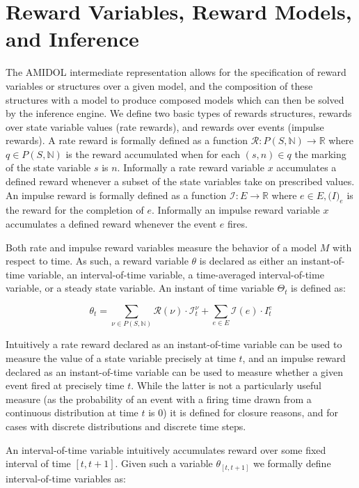\documentclass[11pt]{article}
\newcommand{\amidol}{\textsc{AMIDOL}}
\begin{document}
\section{Reward Variables, Reward Models, and Inference}

The \amidol{} intermediate representation allows for the specification of reward variables or structures over a given model, and the composition of these structures with a model to produce composed models which can then be solved by the inference engine.  We define two basic types of rewards structures, rewards over state variable values (rate rewards), and rewards over events (impulse rewards). \cite{qureshi1996algorithms,deavours1999efficient,ciardo1996well,sanders1991reduced}
A rate reward is formally defined as a function $\mathcal{R}: P(S, \mathbb{N}) \rightarrow \mathbb{R}$ where $q \in P(S, \mathbb{N})$ is the reward accumulated when for each $(s,n) \in q$ the marking of the state variable $s$ is $n$.  Informally a rate reward variable $x$ accumulates a defined reward whenever a subset of the state variables take on prescribed values. An impulse reward is formally defined as a function $\mathcal{I}: E \rightarrow \mathbb{R}$ where $e \in E, \mathcal(I)_e$ is the reward for the completion of $e$.  Informally an impulse reward variable $x$ accumulates a defined reward whenever the event $e$ fires.

Both rate and impulse reward variables measure the behavior of a model $M$ with respect to time.  As such, a reward variable $\theta$ is declared as either an instant-of-time variable, an interval-of-time variable, a time-averaged interval-of-time variable, or a steady state variable.  An instant of time variable $\Theta_t$ is defined as:

\[ \theta_t = \sum_{\nu \in P(S, \mathbb{N})} \mathcal{R}(\nu) \cdot \mathcal{I}^{\nu}_t + \sum_{e \in E} \mathcal{I}(e) \cdot I_t^e\]

Intuitively a rate reward declared as an instant-of-time variable \cite{freire1990technique} can be used to measure the value of a state variable precisely at time $t$, and an impulse reward declared as an instant-of-time variable can be used to measure whether a given event fired at precisely time $t$.  While the latter is not a particularly useful measure (as the probability of an event with a firing time drawn from a continuous distribution at time $t$ is $0$) it is defined for closure reasons, and for cases with discrete distributions and discrete time steps.

An interval-of-time variable intuitively accumulates reward over some fixed interval of time $[t, t+1]$.  Given such a variable $\theta_{[t, t+1]}$ we formally define interval-of-time variables as:
\end{document}
